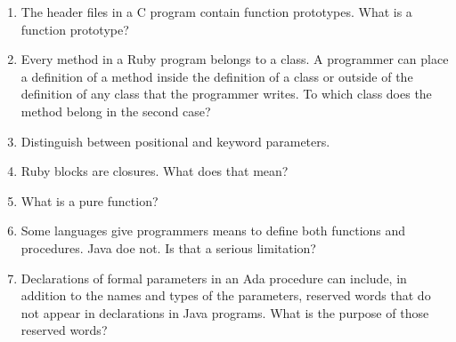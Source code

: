 \begin{enumerate}
    \begin{answer}
    
    \end{answer}

  \item The header files in a C program contain function
    prototypes. What is a function prototype?

    \begin{answer}
    
    \end{answer}

  \item Every method in a Ruby program belongs to a class.
    A programmer can place a definition of a method inside
    the definition of a class or outside of the definition
    of any class that the programmer writes. To which class
    does the method belong in the second case?

    \begin{answer}
    
    \end{answer}

  \item Distinguish between positional and keyword parameters.

  \begin{answer}
    
    \end{answer}

  \item Ruby blocks are closures. What does that mean?

  \begin{answer}
    
    \end{answer}

  \item What is a pure function?

  \begin{answer}
    
    \end{answer}

  \item Some languages give programmers means to define
    both functions and procedures. Java doe not. Is that
    a serious limitation?

    \begin{answer}
    
    \end{answer}

  \item Declarations of formal parameters in an Ada procedure
    can include, in addition to the names and types of the
    parameters, reserved words that do not appear in declarations
    in Java programs. 
    What is the purpose of those reserved words?


\end{enumerate}
